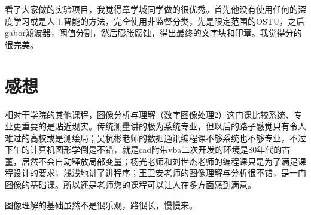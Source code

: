 \documentclass[a4paper,16pt,UTF8]{article}
\begin{document}
看了大家做的实验项目，我觉得章学城同学做的很优秀。首先他没有使用任何的深度学习或是人工智能的方法，完全使用非监督分类，先是限定范围的OSTU，之后gabor滤波器，阈值分割，然后膨胀腐蚀，得出最终的文字块和印章。我觉得分的很完美。

\section{感想}

相对于学院的其他课程，图像分析与理解（数字图像处理2）这门课比较系统、专业更重要的是贴近现实。传统测量讲的极为系统专业，但以后的路子感觉只有令人难过的高校或是测绘局；吴杭彬老师的数据通讯编程课不够系统也不够专业，不过下午的计算机图形学倒是不错，就是cad附带vba二次开发的环境是80年代的古董，居然不会自动释放局部变量；杨光老师和刘世杰老师的编程课只是为了满足课程设计的要求，浅浅地讲了讲程序；王卫安老师的图像理解与分析很不错，是一门图像的基础课。所以还是老师您的课程可以让人在多方面感到满意。

图像理解的基础虽然不是很乐观，路很长，慢慢来。
\end{document}
